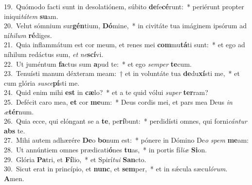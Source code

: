 {19.~}Quómodo facti sunt in desolatiónem, súbito \textbf{de}fe\textbf{cé}runt:~* periérunt propter iniqui\textit{tá}\textit{tem} \textbf{su}am.\\
{20.~}Velut sómnium sur\textbf{gén}tium, \textbf{Dó}mine,~* in civitáte tua imáginem ipsórum ad ní\textit{hi}\textit{lum} \textbf{ré}diges.\\
{21.~}Quia inflammátum est cor meum, et renes mei \textbf{com}mu\textbf{tá}ti sunt:~* et ego ad níhilum redáctus sum, \textit{et} \textit{ne}\textbf{scí}vi.\\
{22.~}Ut juméntum \textbf{fa}ctus sum \textbf{a}pud te:~* et ego \textit{sem}\textit{per} \textbf{te}cum.\\
{23.~}Tenuísti manum déxteram meam:~† et in voluntáte tua \textbf{de}du\textbf{xí}sti me,~* et cum glória \textit{su}\textit{sce}\textbf{pí}sti me.\\
{24.~}Quid enim mihi \textbf{est} in \textbf{cæ}lo?~* et a te quid vólui \textit{su}\textit{per} \textbf{ter}ram?\\
{25.~}Defécit caro mea, \textbf{et} cor \textbf{me}um:~* Deus cordis mei, et pars mea Deus \textit{in} \textit{æ}\textbf{tér}num.\\
{26.~}Quia ecce, qui elóngant se a \textbf{te}, pe\textbf{rí}bunt:~* perdidísti omnes, qui forni\textit{cán}\textit{tur} \textbf{abs} te.\\
{27.~}Mihi autem adhærére \textbf{De}o \textbf{bo}num est:~* pónere in Dómino De\textit{o} \textit{spem} \textbf{me}am:\\
{28.~}Ut annúntiem omnes prædicati\textbf{ó}nes \textbf{tu}as,~* in portis fí\textit{li}\textit{æ} \textbf{Si}on.\\
{29.~}Glória \textbf{Pa}tri, et \textbf{Fí}lio,~* et Spirí\textit{tu}\textit{i} \textbf{San}cto.\\
{30.~}Sicut erat in princípio, et \textbf{nunc}, et \textbf{sem}per,~* et in sǽcula sæcu\textit{ló}\textit{rum}. \textbf{A}men.\\
